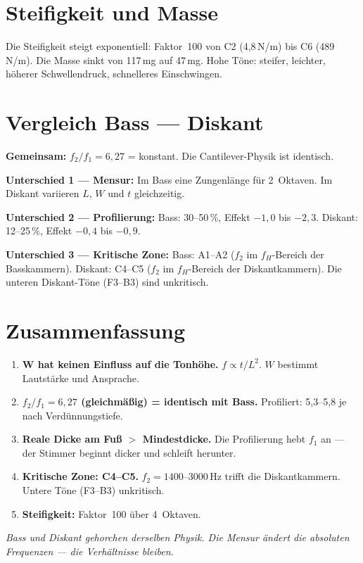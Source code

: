 \documentclass[11pt,a4paper]{article}
\begin{document}
\section{Steifigkeit und Masse}

Die Steifigkeit steigt exponentiell: Faktor~100 von C2 (4,8\,N/m) bis
C6 (489\,N/m). Die Masse sinkt von 117\,mg auf 47\,mg. Hohe Töne:
steifer, leichter, höherer Schwellendruck, schnelleres Einschwingen.

\section{Vergleich Bass --- Diskant}

\textbf{Gemeinsam:} $f_2/f_1 = 6{,}27$ = konstant. Die Cantilever-Physik
ist identisch.

\textbf{Unterschied 1 --- Mensur:} Im Bass eine Zungenlänge für 2~Oktaven.
Im Diskant variieren $L$, $W$ und $t$ gleichzeitig.

\textbf{Unterschied 2 --- Profilierung:} Bass: 30--50\,\%, Effekt $-1{,}0$ bis
$-2{,}3$. Diskant: 12--25\,\%, Effekt $-0{,}4$ bis $-0{,}9$.

\textbf{Unterschied 3 --- Kritische Zone:} Bass: A1--A2 ($f_2$ im $f_H$-Bereich
der Basskammern). Diskant: C4--C5 ($f_2$ im $f_H$-Bereich der Diskantkammern).
Die unteren Diskant-Töne (F3--B3) sind unkritisch.

\section{Zusammenfassung}

\begin{enumerate}
\item \textbf{W hat keinen Einfluss auf die Tonhöhe.} $f \propto t/L^2$.
  $W$ bestimmt Lautstärke und Ansprache.
\item \textbf{$f_2/f_1 = 6{,}27$ (gleichmäßig) = identisch mit Bass.}
  Profiliert: 5,3--5,8 je nach Verdünnungstiefe.
\item \textbf{Reale Dicke am Fuß $>$ Mindestdicke.} Die Profilierung
  hebt $f_1$ an --- der Stimmer beginnt dicker und schleift herunter.
\item \textbf{Kritische Zone: C4--C5.} $f_2 = 1400$--$3000$\,Hz trifft
  die Diskantkammern. Untere Töne (F3--B3) unkritisch.
\item \textbf{Steifigkeit:} Faktor~100 über 4~Oktaven.
\end{enumerate}

\bigskip
\textit{Bass und Diskant gehorchen derselben Physik.
Die Mensur ändert die absoluten Frequenzen --- die Verhältnisse bleiben.}
\end{document}
